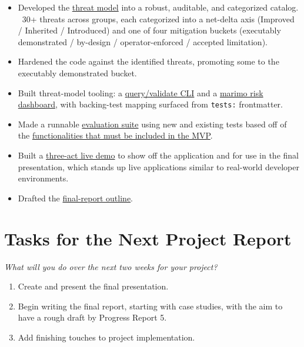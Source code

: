 \documentclass[12pt]{article}
\newcommand{\PRNumber}{5}
\newcommand{\RepoURL}{https://github.com/Ian-Costa18/Cybersecurity-Practicum/blob/progress-report-\PRNumber}
\newcommand{\instruction}[1]{{\small\itshape #1}}
\begin{document}
\begin{itemize}[leftmargin=1.5em, itemsep=2pt]
  \item Developed the \href{\RepoURL/docs/threat-model}{threat model} into a robust, auditable, and categorized catalog. ~30+ threats across groups, each categorized into a net-delta axis (Improved / Inherited / Introduced) and one of four mitigation buckets (executably demonstrated / by-design / operator-enforced / accepted limitation).
  \item Hardened the code against the identified threats, promoting some to the executably demonstrated bucket.
  \item Built threat-model tooling: a \href{\RepoURL/tools/threat_model.py}{query/validate CLI} and a \href{\RepoURL/docs/threat-model/threat_model_dashboard.py}{marimo risk dashboard}, with backing-test mapping surfaced from \texttt{tests:} frontmatter.
  \item Made a runnable \href{\RepoURL/tools/evidence.py}{evaluation suite} using new and existing tests based off of the \href{\RepoURL/docs/mvp-prd.md}{functionalities that must be included in the MVP}.
  \item Built a \href{\RepoURL/demo/notebooks/publish_demo.py}{three-act live demo} to show off the application and for use in the final presentation, which stands up live applications similar to real-world developer environments.
  \item Drafted the \href{\RepoURL/Practicum\%20Work/Final\%20Report/outline.md}{final-report outline}.
\end{itemize}

\section*{Tasks for the Next Project Report}

\instruction{What will you do over the next two weeks for your project?}

\begin{enumerate}[leftmargin=1.5em, itemsep=2pt]
  \item Create and present the final presentation.
  \item Begin writing the final report, starting with case studies, with the aim to have a rough draft by Progress Report 5.
  \item Add finishing touches to project implementation.
\end{enumerate}
\end{document}
